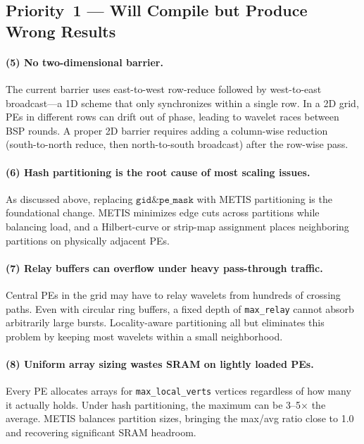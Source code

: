 \documentclass[11pt,letterpaper]{article}
\begin{document}
\subsection{Priority~1 --- Will Compile but Produce Wrong Results}

\paragraph{(5) No two-dimensional barrier.}
The current barrier uses east-to-west row-reduce followed by
west-to-east broadcast---a 1D scheme that only synchronizes within a single row.
In a 2D grid, PEs in different rows can drift out of phase,
leading to wavelet races between BSP rounds.
A proper 2D barrier requires adding a column-wise reduction
(south-to-north reduce, then north-to-south broadcast)
after the row-wise pass.

\paragraph{(6) Hash partitioning is the root cause of most scaling issues.}
As discussed above, replacing $\texttt{gid} \mathbin{\&} \texttt{pe\_mask}$
with METIS partitioning is the foundational change.
METIS minimizes edge cuts across partitions while balancing load,
and a Hilbert-curve or strip-map assignment places neighboring partitions
on physically adjacent PEs.

\paragraph{(7) Relay buffers can overflow under heavy pass-through traffic.}
Central PEs in the grid may have to relay wavelets from hundreds of crossing paths.
Even with circular ring buffers, a fixed depth of \texttt{max\_relay}
cannot absorb arbitrarily large bursts.
Locality-aware partitioning all but eliminates this problem
by keeping most wavelets within a small neighborhood.

\paragraph{(8) Uniform array sizing wastes SRAM on lightly loaded PEs.}
Every PE allocates arrays for \texttt{max\_local\_verts} vertices
regardless of how many it actually holds.
Under hash partitioning, the maximum can be 3--5$\times$ the average.
METIS balances partition sizes, bringing the max/avg ratio close to 1.0
and recovering significant SRAM headroom.
\end{document}
